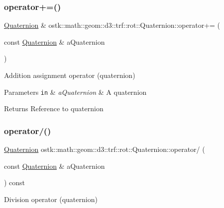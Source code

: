 \subsubsection{\texorpdfstring{operator+=()}{operator+=()}}
{\footnotesize\ttfamily \hyperlink{classostk_1_1math_1_1geom_1_1d3_1_1trf_1_1rot_1_1_quaternion}{Quaternion} \& ostk\+::math\+::geom\+::d3\+::trf\+::rot\+::\+Quaternion\+::operator+= (\begin{DoxyParamCaption}\item[{const \hyperlink{classostk_1_1math_1_1geom_1_1d3_1_1trf_1_1rot_1_1_quaternion}{Quaternion} \&}]{a\+Quaternion }\end{DoxyParamCaption})}



Addition assignment operator (quaternion) 


\begin{DoxyParams}[1]{Parameters}
\mbox{\tt in}  & {\em a\+Quaternion} & A quaternion \\
\hline
\end{DoxyParams}
\begin{DoxyReturn}{Returns}
Reference to quaternion 
\end{DoxyReturn}
\mbox{\label{classostk_1_1math_1_1geom_1_1d3_1_1trf_1_1rot_1_1_quaternion_a6f99e31b1d9a0423b90ae83d79847ad4}} 
\subsubsection{\texorpdfstring{operator/()}{operator/()}}
{\footnotesize\ttfamily \hyperlink{classostk_1_1math_1_1geom_1_1d3_1_1trf_1_1rot_1_1_quaternion}{Quaternion} ostk\+::math\+::geom\+::d3\+::trf\+::rot\+::\+Quaternion\+::operator/ (\begin{DoxyParamCaption}\item[{const \hyperlink{classostk_1_1math_1_1geom_1_1d3_1_1trf_1_1rot_1_1_quaternion}{Quaternion} \&}]{a\+Quaternion }\end{DoxyParamCaption}) const}



Division operator (quaternion) 


